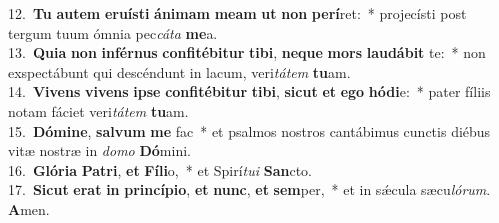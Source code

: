 {12.~}\textbf{Tu} \textbf{au}\textbf{tem} \textbf{e}\textbf{ru}\textbf{í}\textbf{sti} \textbf{á}\textbf{ni}\textbf{mam} \textbf{me}\textbf{am} \textbf{ut} \textbf{non} \textbf{pe}\textbf{rí}ret:~* projecísti post tergum tuum ómnia pec\textit{cá}\textit{ta} \textbf{me}a.\\
{13.~}\textbf{Qui}\textbf{a} \textbf{non} \textbf{in}\textbf{fér}\textbf{nus} \textbf{con}\textbf{fi}\textbf{té}\textbf{bi}\textbf{tur} \textbf{ti}\textbf{bi}, \textbf{ne}\textbf{que} \textbf{mors} \textbf{lau}\textbf{dá}\textbf{bit} te:~* non exspectábunt qui descéndunt in lacum, veri\textit{tá}\textit{tem} \textbf{tu}am.\\
{14.~}\textbf{Vi}\textbf{vens} \textbf{vi}\textbf{vens} \textbf{i}\textbf{pse} \textbf{con}\textbf{fi}\textbf{té}\textbf{bi}\textbf{tur} \textbf{ti}\textbf{bi}, \textbf{si}\textbf{cut} \textbf{et} \textbf{e}\textbf{go} \textbf{hó}\textbf{di}e:~* pater fíliis notam fáciet veri\textit{tá}\textit{tem} \textbf{tu}am.\\
{15.~}\textbf{Dó}\textbf{mi}\textbf{ne}, \textbf{sal}\textbf{vum} \textbf{me} fac~* et psalmos nostros cantábimus cunctis diébus vitæ nostræ in \textit{do}\textit{mo} \textbf{Dó}mini.\\
{16.~}\textbf{Gló}\textbf{ri}\textbf{a} \textbf{Pa}\textbf{tri}, \textbf{et} \textbf{Fí}\textbf{li}o,~* et Spirí\textit{tu}\textit{i} \textbf{San}cto.\\
{17.~}\textbf{Si}\textbf{cut} \textbf{e}\textbf{rat} \textbf{in} \textbf{prin}\textbf{cí}\textbf{pi}\textbf{o}, \textbf{et} \textbf{nunc}, \textbf{et} \textbf{sem}per,~* et in sǽcula sæcu\textit{ló}\textit{rum}. \textbf{A}men.\\
